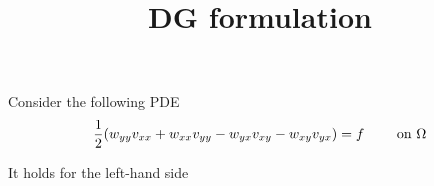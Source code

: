 \documentclass[a4paper,11pt]{article}
\title{DG formulation}
\newcommand{\myint}{\displaystyle\int}
\begin{document}
\maketitle

Consider the following PDE 
\begin{equation}
	\frac 1 2 (w_{yy} v_{xx}+w_{xx} v_{yy} - w_{yx} v_{xy} - w_{xy} v_{yx}) = f \qquad \textnormal{ on } \Omega \label{PDE}		
\end{equation}



It holds for the left-hand side
\end{document}

